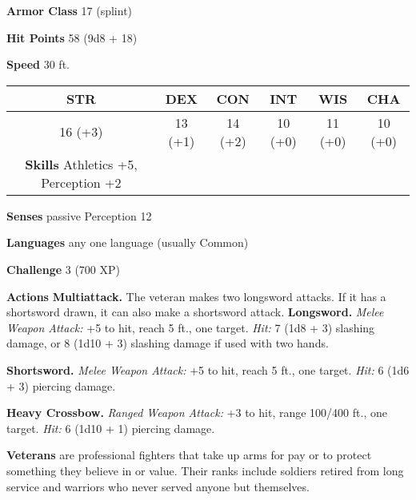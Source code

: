 \documentclass[
]{article}
\begin{document}
\textbf{Armor Class} 17 (splint)

\textbf{Hit Points} 58 (9d8 + 18)

\textbf{Speed} 30 ft.

\begin{longtable}[]{@{}cccccc@{}}
\toprule
STR & DEX & CON & INT & WIS & CHA\tabularnewline
\midrule
\endhead
16 (+3) & 13 (+1) & 14 (+2) & 10 (+0) & 11 (+0) & 10 (+0)\tabularnewline
\textbf{Skills} Athletics +5, Perception +2 & & & & &\tabularnewline
\bottomrule
\end{longtable}

\textbf{Senses} passive Perception 12

\textbf{Languages} any one language (usually Common)

\textbf{Challenge} 3 (700 XP)

\textbf{Actions} \textbf{Multiattack.} The veteran makes two longsword
attacks. If it has a shortsword drawn, it can also make a shortsword
attack. \textbf{Longsword.} \emph{Melee Weapon Attack:} +5 to hit, reach
5 ft., one target. \emph{Hit:} 7 (1d8 + 3) slashing damage, or 8 (1d10 +
3) slashing damage if used with two hands.

\textbf{Shortsword.} \emph{Melee Weapon Attack:} +5 to hit, reach 5 ft.,
one target. \emph{Hit:} 6 (1d6 + 3) piercing damage.

\textbf{Heavy Crossbow.} \emph{Ranged Weapon Attack:} +3 to hit, range
100/400 ft., one target. \emph{Hit:} 6 (1d10 + 1) piercing damage.

\textbf{Veterans} are professional fighters that take up arms for pay or
to protect something they believe in or value. Their ranks include
soldiers retired from long service and warriors who never served anyone
but themselves.
\end{document}

